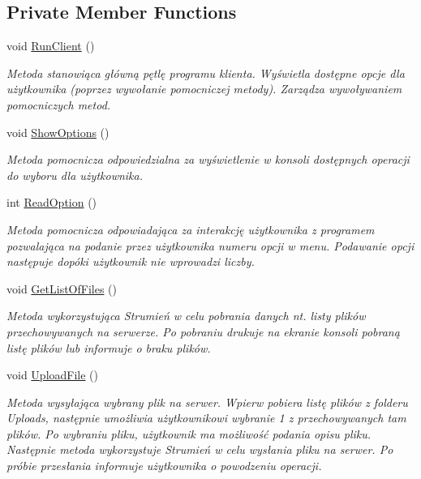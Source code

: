 \subsection*{Private Member Functions}
\begin{DoxyCompactItemize}
\item 
void \hyperlink{class_wcf_stream_service_client_1_1_client_af48e3d7be49a0136ad495035415e799f}{Run\+Client} ()
\begin{DoxyCompactList}\small\item\em Metoda stanowiąca główną pętlę programu klienta. Wyświetla dostępne opcje dla użytkownika (poprzez wywołanie pomocniczej metody). Zarządza wywoływaniem pomocniczych metod. \end{DoxyCompactList}\item 
void \hyperlink{class_wcf_stream_service_client_1_1_client_a448069d7619faa8b146c87a734fbb8a6}{Show\+Options} ()
\begin{DoxyCompactList}\small\item\em Metoda pomocnicza odpowiedzialna za wyświetlenie w konsoli dostępnych operacji do wyboru dla użytkownika. \end{DoxyCompactList}\item 
int \hyperlink{class_wcf_stream_service_client_1_1_client_a2e7604484e1dc3f97b475c6849be1e38}{Read\+Option} ()
\begin{DoxyCompactList}\small\item\em Metoda pomocnicza odpowiadająca za interakcję użytkownika z programem pozwalająca na podanie przez użytkownika numeru opcji w menu. Podawanie opcji następuje dopóki użytkownik nie wprowadzi liczby. \end{DoxyCompactList}\item 
void \hyperlink{class_wcf_stream_service_client_1_1_client_a7ad1660ea61123c161159cb54d863021}{Get\+List\+Of\+Files} ()
\begin{DoxyCompactList}\small\item\em Metoda wykorzystująca Strumień w celu pobrania danych nt. listy plików przechowywanych na serwerze. Po pobraniu drukuje na ekranie konsoli pobraną listę plików lub informuje o braku plików. \end{DoxyCompactList}\item 
void \hyperlink{class_wcf_stream_service_client_1_1_client_a2262b00b6486bc8db00049dc0d156895}{Upload\+File} ()
\begin{DoxyCompactList}\small\item\em Metoda wysyłająca wybrany plik na serwer. Wpierw pobiera listę plików z folderu \textquotesingle{}Uploads\textquotesingle{}, następnie umożliwia użytkownikowi wybranie 1 z przechowywanych tam plików. Po wybraniu pliku, użytkownik ma możliwość podania opisu pliku. Następnie metoda wykorzystuje Strumień w celu wysłania pliku na serwer. Po próbie przesłania informuje użytkownika o powodzeniu operacji. \end{DoxyCompactList}\item 

\end{DoxyCompactItemize}
